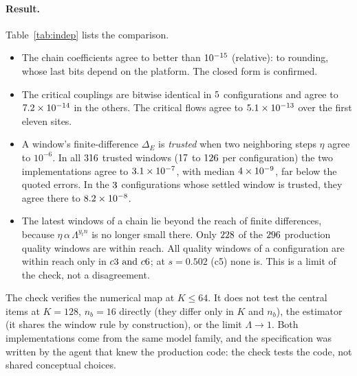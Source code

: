 \documentclass[10pt,a4paper]{article}
\newcommand{\DE}{\Delta_E}
\begin{document}
\paragraph{Result.} Table~\ref{tab:indep} lists the comparison.
\begin{itemize}
\item The chain coefficients agree to better than $10^{-15}$ (relative): to rounding, whose last bits depend on the platform. The
  closed form is confirmed.
\item The critical couplings are bitwise identical in $5$ configurations and agree to $7.2\times10^{-14}$ in the others.
  The critical flows agree to $5.1\times10^{-13}$ over the first eleven sites.
\item A window's finite-difference $\DE$ is \emph{trusted} when two neighboring steps $\eta$ agree to $10^{-6}$. In all
  $316$ trusted windows ($17$ to $126$ per configuration) the two implementations agree to
  $3.1\times10^{-7}$, with median $4\times10^{-9}$, far below the quoted errors. In the $3$ configurations whose settled window
  is trusted, they agree there to $8.2\times10^{-8}$.
\item The latest windows of a chain lie beyond the reach of finite differences, because $\eta\,\alpha\,\Lambda^{y_tn}$ is no longer
  small there. Only $228$ of the $296$ production quality windows are within reach. All quality windows of a
  configuration are within reach only in $c3\text{ and }c6$; at $s=0.502$ (c5) none is. This is a limit of the check, not a
  disagreement.
\end{itemize}
The check verifies the numerical map at $K\le64$. It does not test the central items at $K=128$, $n_b=16$ directly (they differ only in
$K$ and $n_b$), the estimator (it shares the window rule by construction), or the limit $\Lambda\to1$. Both implementations come from
the same model family, and the specification was written by the agent that knew the production code: the check tests the code, not
shared conceptual choices.

\begin{table}[ht]\centering\scriptsize\setlength{\tabcolsep}{4pt}
\caption{Second implementation against production. Columns: configuration $(s,\Lambda,K,n_b,N)$; largest relative difference of the
rescaled chain coefficients (a rounding-level bound); relative difference of $\alpha_c$; number of trusted windows; largest window-by-window difference
$|\delta\DE|$ over them; production quality windows within finite-difference reach (covered/all); production quality range.}\label{tab:indep}

\end{table}
\end{document}

